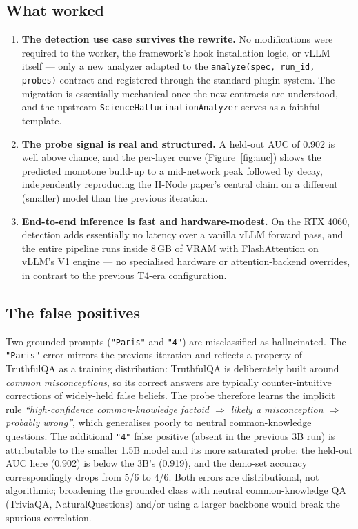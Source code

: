 \documentclass[11pt]{article}
\begin{document}
\subsection{What worked}
\begin{enumerate}
  \item \textbf{The detection use case survives the rewrite.} No modifications were required
  to the worker, the framework's hook installation logic, or vLLM itself --- only a new
  analyzer adapted to the \texttt{analyze(spec, run\_id, probes)} contract and registered
  through the standard plugin system. The migration is essentially mechanical once the new
  contracts are understood, and the upstream \texttt{ScienceHallucinationAnalyzer} serves as a
  faithful template.
  \item \textbf{The probe signal is real and structured.} A held-out AUC of 0.902 is well
  above chance, and the per-layer curve (Figure~\ref{fig:auc}) shows the predicted
  monotone build-up to a mid-network peak followed by decay, independently reproducing the
  H-Node paper's central claim on a different (smaller) model than the previous iteration.
  \item \textbf{End-to-end inference is fast and hardware-modest.} On the RTX 4060, detection
  adds essentially no latency over a vanilla vLLM forward pass, and the entire pipeline runs
  inside 8\,GB of VRAM with FlashAttention on vLLM's V1 engine --- no specialised hardware or
  attention-backend overrides, in contrast to the previous T4-era configuration.
\end{enumerate}

\subsection{The false positives}\label{sec:fp}
Two grounded prompts (\texttt{"Paris"} and \texttt{"4"}) are misclassified as hallucinated.
The \texttt{"Paris"} error mirrors the previous iteration and reflects a property of TruthfulQA
as a training distribution: TruthfulQA is deliberately built around \emph{common
misconceptions}, so its correct answers are typically counter-intuitive corrections of
widely-held false beliefs. The probe therefore learns the implicit rule
\emph{``high-confidence common-knowledge factoid $\Rightarrow$ likely a misconception
$\Rightarrow$ probably wrong''}, which generalises poorly to neutral common-knowledge
questions. The additional \texttt{"4"} false positive (absent in the previous 3B run) is
attributable to the smaller 1.5B model and its more saturated probe: the held-out AUC here
(0.902) is below the 3B's (0.919), and the demo-set accuracy correspondingly drops from 5/6 to
4/6. Both errors are distributional, not algorithmic; broadening the grounded class with
neutral common-knowledge QA (TriviaQA, NaturalQuestions) and/or using a larger backbone would
break the spurious correlation.
\end{document}
